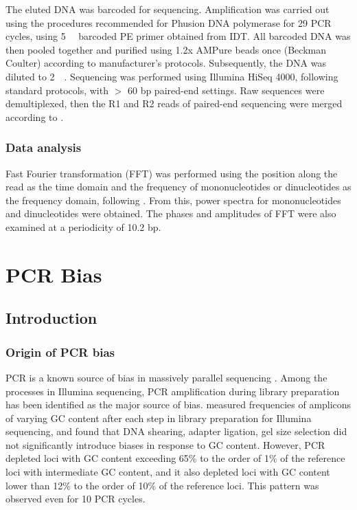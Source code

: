 \documentclass[a4paper, numbers=noenddot]{scrbook}
\begin{document}
The eluted DNA was barcoded for sequencing.  Amplification was carried out using the procedures recommended for Phusion DNA polymerase for 29 PCR cycles, using \SI{5}{\micro\Molar} barcoded PE primer obtained from IDT.  All barcoded DNA was then pooled together and purified using 1.2x AMPure beads once (Beckman Coulter) according to manufacturer's protocols.  Subsequently, the DNA was diluted to \SI{2}{\nano\Molar}.  Sequencing was performed using Illumina HiSeq 4000, following standard protocols, with $>$ 60 bp paired-end settings.  Raw sequences were demultiplexed, then the R1 and R2 reads of paired-end sequencing were merged according to \citet{zhu_interaction_2018}.

\subsection{Data analysis}
\label{ssec:emsaselex_methods_anal}

Fast Fourier transformation (FFT) was performed using the position along the read as the time domain and the frequency of mononucleotides or dinucleotides as the frequency domain, following \citet{zhu_interaction_2018}.  From this, power spectra for mononucleotides and dinucleotides were obtained.  The phases and amplitudes of FFT were also examined at a periodicity of 10.2 bp.

\chapter{PCR Bias}
\label{ch:pcrbias}

\section{Introduction}
\label{sec:pcrbias_intro}

\subsection{Origin of PCR bias}
\label{ssec:pcrbias_intro_origin}

PCR is a known source of bias in massively parallel sequencing \citep{olova_comparison_2018}.  Among the processes in Illumina sequencing, PCR amplification during library preparation has been identified as the major source of bias.  \citet{aird_analyzing_2011} measured frequencies of amplicons of varying GC content after each step in library preparation for Illumina sequencing, and found that DNA shearing, adapter ligation, gel size selection did not significantly introduce biases in response to GC content.  However, PCR depleted loci with GC content exceeding 65\% to the order of 1\% of the reference loci with intermediate GC content, and it also depleted loci with GC content lower than 12\% to the order of 10\% of the reference loci.  This pattern was observed even for 10 PCR cycles.
\end{document}
